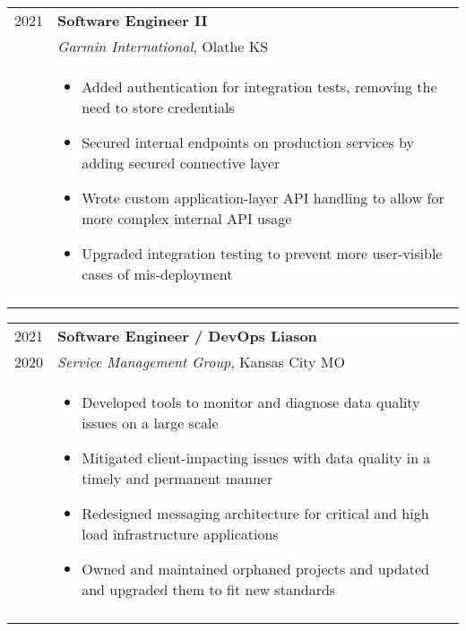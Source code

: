 \documentclass[a4paper,10pt]{article}
\newcommand{\br}{\\\multicolumn{2}{c}{}}
\begin{document}
\begin{tabular}{r|p{15cm}}
    \textsc{2021}  & \textbf{Software Engineer II} \\
                   & \textit{Garmin International}, Olathe KS \\ &
    \begin{itemize}
    \item Added authentication for integration tests, removing the need to store credentials
    \item Secured internal endpoints on production services by adding secured connective layer
    \item Wrote custom application-layer API handling to allow for more complex internal API usage
    \item Upgraded integration testing to prevent more user-visible cases of mis-deployment

    \end{itemize} \br\\

\end{tabular}

\begin{tabular}{r|p{15cm}}
    \textsc{2021}  & \textbf{Software Engineer / DevOps Liason} \\
    \textsc{2020}  & \textit{Service Management Group}, Kansas City MO \\ &
    \begin{itemize}
    \item Developed tools to monitor and diagnose data quality issues on a large scale
    \item Mitigated client-impacting issues with data quality in a timely and permanent manner
    \item Redesigned messaging architecture for critical and high load infrastructure applications
    \item Owned and maintained orphaned projects and updated and upgraded them to fit new standards

    \end{itemize} \br\\

\end{tabular}
\end{document}
